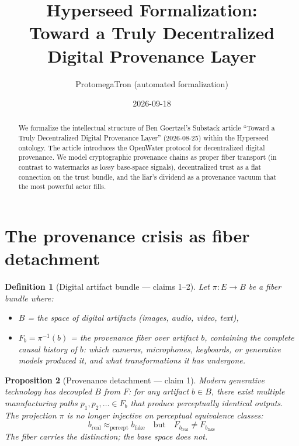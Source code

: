 \documentclass[11pt,a4paper]{article}
\title{Hyperseed Formalization:\\
  Toward a Truly Decentralized Digital Provenance Layer}
\author{ProtomegaTron (automated formalization)}
\date{2026-09-18}
\newtheorem{definition}{Definition}[section]
\newtheorem{proposition}[definition]{Proposition}
\begin{document}
\maketitle

\begin{abstract}
We formalize the intellectual structure of Ben Goertzel's Substack article
``Toward a Truly Decentralized Digital Provenance Layer''
(2026-08-25) within the Hyperseed ontology. The article introduces the
OpenWater protocol for decentralized digital provenance. We model
cryptographic provenance chains as proper fiber transport (in contrast to
watermarks as lossy base-space signals), decentralized trust as a flat
connection on the trust bundle, and the liar's dividend as a provenance
vacuum that the most powerful actor fills.
\end{abstract}

\tableofcontents

\section{The provenance crisis as fiber detachment}
\label{sec:crisis}

\begin{definition}[Digital artifact bundle --- claims 1--2]
\label{def:artifact-bundle}
Let $\pi : E \to B$ be a fiber bundle where:
\begin{itemize}
\item $B$ = the space of digital artifacts (images, audio, video, text),
\item $F_b = \pi^{-1}(b)$ = the provenance fiber over artifact $b$,
  containing the complete causal history of $b$: which cameras, microphones,
  keyboards, or generative models produced it, and what transformations
  it has undergone.
\end{itemize}
\end{definition}

\begin{proposition}[Provenance detachment --- claim 1]
\label{prop:detachment}
Modern generative technology has decoupled $B$ from $F$: for any
artifact $b \in B$, there exist multiple manufacturing paths
$p_1, p_2, \ldots \in F_b$ that produce perceptually identical outputs.
The projection $\pi$ is no longer injective on perceptual equivalence
classes:
\[
  b_{\text{real}} \approx_{\text{percept}} b_{\text{fake}}
  \quad \text{but} \quad
  F_{b_{\text{real}}} \neq F_{b_{\text{fake}}}
\]
The fiber carries the distinction; the base space does not.
\end{proposition}
\end{document}
